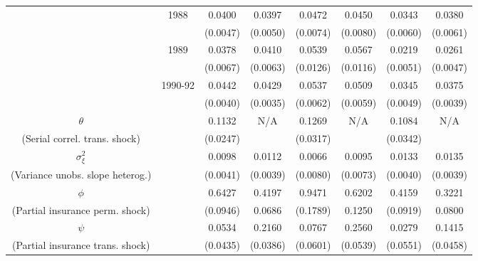 \begin{table}
\begin{center}
{\begin{tabular}{cc|cc|cc|cc}
\\  & 1988 & 0.0400 &   0.0397 & 0.0472 &   0.0450 & 0.0343 &   0.0380
\\  &                    & (0.0047) & (0.0050)  & (0.0074) & (0.0080)  & (0.0060) & (0.0061) 
\\  & 1989 & 0.0378 &   0.0410 & 0.0539 &   0.0567 & 0.0219 &   0.0261
\\  &                    & (0.0067) & (0.0063)  & (0.0126) & (0.0116)  & (0.0051) & (0.0047) 
\\  & 1990-92 & 0.0442 &   0.0429 & 0.0537 &   0.0509 & 0.0345 &   0.0375 
\\  &         & (0.0040) & (0.0035) & (0.0062) & (0.0059) & (0.0049) & (0.0039) 
\\ \hline  
 $\theta$ &     & 0.1132 &   N/A & 0.1269 &   N/A & 0.1084 &   N/A 
\\ (Serial correl. trans. shock) &     & (0.0247) &  & (0.0317) &  & (0.0342) &  
\\ $\sigma^2_{\xi}$ &     & 0.0098 &   0.0112 & 0.0066 &   0.0095 & 0.0133 &   0.0135 
\\ (Variance unobs. slope heterog.) &     & (0.0041) & (0.0039) & (0.0080) & (0.0073) & (0.0040) & (0.0039) 
\\ \hline  
 $\phi$ &     & 0.6427 &   0.4197 & 0.9471 &   0.6202 & 0.4159 &   0.3221 
\\ (Partial insurance perm. shock) &     & (0.0946) & 0.0686 & (0.1789) & 0.1250 & (0.0919) & 0.0800 
\\ $\psi$ &     & 0.0534 &   0.2160 & 0.0767 &   0.2560 & 0.0279 &   0.1415 
\\ (Partial insurance trans. shock) &     & (0.0435) & (0.0386) & (0.0601) & (0.0539) & (0.0551) & (0.0458) 
\\ \hline  
 \end{tabular}   
 } 
 \usebox{\ReplicationTable}  
\settowidth\TableWidth{\usebox{\ReplicationTable}} %
\end{center}  
\end{table}  
